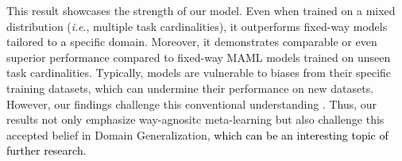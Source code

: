 \documentclass[letterpaper]{article} %
\newcommand{\nj}[1]{\textcolor{black}{#1}}
\newcommand{\jh}[1]{\textcolor{black}{#1}}
\newcommand{\ie}{\textit{i}.\textit{e}., }
\begin{document}
This result showcases the strength of our model. Even when trained on a mixed distribution (\ie multiple task cardinalities), it outperforms fixed-way models tailored to \nj{a} specific domain. %
Moreover, it demonstrates comparable or even superior performance compared to fixed-way MAML models trained on unseen task cardinalities. Typically, models are vulnerable to biases from their specific training datasets, which can undermine their performance on new datasets. However, our findings challenge this conventional understanding \cite{theory:specificdataset}.
Thus, our results not only emphasize way-agnositc meta-learning but also challenge this accepted belief in Domain Generalization, \nj{which can be an interesting topic of further research}.
\end{document}
